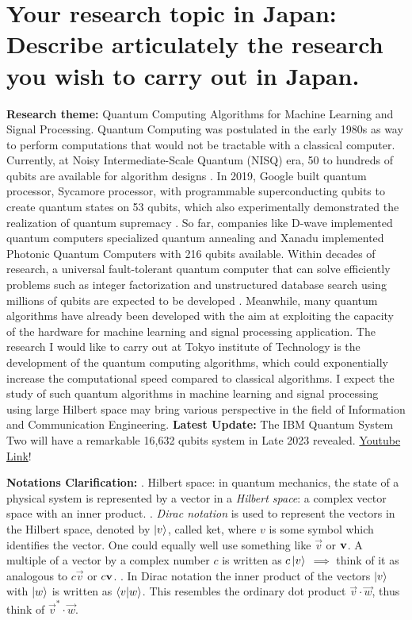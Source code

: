 \documentclass{article}
\begin{document}
\section{Your research topic in Japan:
Describe articulately the research you wish
to carry out in Japan.}
\textbf{Research theme:} Quantum Computing Algorithms for 
Machine Learning and Signal Processing.  \newline 
\newline
Quantum Computing was postulated in the early 1980s as way to 
perform computations that would not be tractable with a classical 
computer. Currently, at Noisy Intermediate-Scale Quantum (NISQ)
era, 50 to hundreds of qubits are available for algorithm designs \cite{aps_review}.
In 2019, Google built quantum processor, Sycamore processor, 
with programmable superconducting qubits to create quantum states on 
53 qubits, which also experimentally demonstrated the realization of 
quantum supremacy \cite{qc_supremacy}.
So far, companies like D-wave implemented quantum computers specialized 
quantum annealing and Xanadu implemented Photonic Quantum Computers with 
216 qubits available. 
 Within decades of research, a universal fault-tolerant 
quantum computer that can solve efficiently problems such 
as integer factorization and unstructured database search using 
millions of qubits are expected to be developed \cite{qml_hep}. 
Meanwhile, many quantum algorithms have already been  
developed with the aim at exploiting the capacity of the 
hardware for machine learning and signal processing application. 
The research I would like to carry out at Tokyo institute of Technology
is the development of the quantum computing algorithms, which could 
exponentially increase the computational speed compared to classical 
algorithms. I expect the study of such 
quantum algorithms in machine learning and signal processing 
using large Hilbert space may bring various perspective 
in the field of Information and Communication Engineering. \textbf{Latest Update:}
The IBM Quantum System Two will have a remarkable 16,632 qubits 
system in Late 2023 revealed. \href{https://www.youtube.com/watch?v=AQjKUN8PORM}{Youtube Link}!

\textbf{Notations Clarification: }. Hilbert space: in quantum mechanics, 
the state of a physical system is represented by a vector in 
a \textit{Hilbert space}: a complex vector space with an inner product. . \textit{Dirac notation} is used to represent the vectors in the 
Hilbert space, denoted by $\ket{v}$, called ket, where $v$ is 
some symbol which identifies the vector. One could equally well 
use something like $\overrightarrow{v}$ or $\text{\textbf{v}}$. A 
multiple of a vector by a complex number $c$ is written as 
$c\ket{v}$ $\implies$ think of it as analogous to $c \overrightarrow{v}$ 
or $c \text{\textbf{v}}$. . In Dirac notation the inner 
product of the vectors $\ket{v}$ with $\ket{w}$ is written as $\braket{v}{w}$. 
This resembles the ordinary dot product $\overrightarrow{v} \cdot \overrightarrow{w}$, 
thus think of $\overrightarrow{v}^{*} \cdot \overrightarrow{w}$.
\end{document}
